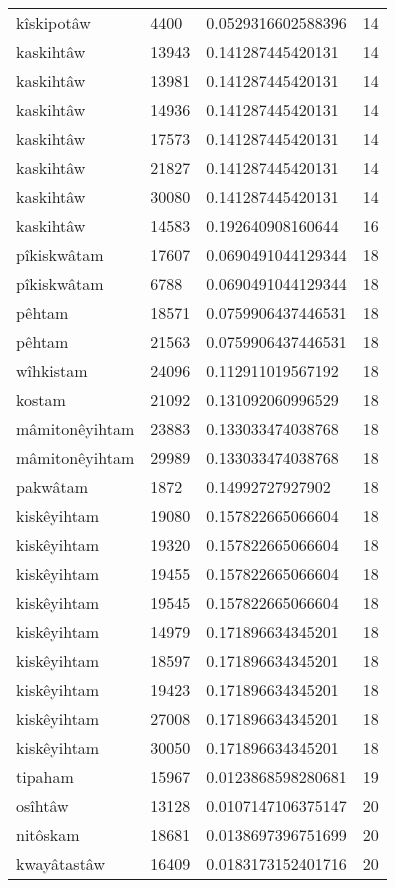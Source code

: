 \begin{longtable}{llll}
kîskipotâw & 4400 & 0.0529316602588396 & 14 \\
kaskihtâw & 13943 & 0.141287445420131 & 14 \\
kaskihtâw & 13981 & 0.141287445420131 & 14 \\
kaskihtâw & 14936 & 0.141287445420131 & 14 \\
kaskihtâw & 17573 & 0.141287445420131 & 14 \\
kaskihtâw & 21827 & 0.141287445420131 & 14 \\
kaskihtâw & 30080 & 0.141287445420131 & 14 \\
kaskihtâw & 14583 & 0.192640908160644 & 16 \\
pîkiskwâtam & 17607 & 0.0690491044129344 & 18 \\
pîkiskwâtam & 6788 & 0.0690491044129344 & 18 \\
pêhtam & 18571 & 0.0759906437446531 & 18 \\
pêhtam & 21563 & 0.0759906437446531 & 18 \\
wîhkistam & 24096 & 0.112911019567192 & 18 \\
kostam & 21092 & 0.131092060996529 & 18 \\
mâmitonêyihtam & 23883 & 0.133033474038768 & 18 \\
mâmitonêyihtam & 29989 & 0.133033474038768 & 18 \\
pakwâtam & 1872 & 0.14992727927902 & 18 \\
kiskêyihtam & 19080 & 0.157822665066604 & 18 \\
kiskêyihtam & 19320 & 0.157822665066604 & 18 \\
kiskêyihtam & 19455 & 0.157822665066604 & 18 \\
kiskêyihtam & 19545 & 0.157822665066604 & 18 \\
kiskêyihtam & 14979 & 0.171896634345201 & 18 \\
kiskêyihtam & 18597 & 0.171896634345201 & 18 \\
kiskêyihtam & 19423 & 0.171896634345201 & 18 \\
kiskêyihtam & 27008 & 0.171896634345201 & 18 \\
kiskêyihtam & 30050 & 0.171896634345201 & 18 \\
tipaham & 15967 & 0.0123868598280681 & 19 \\
osîhtâw & 13128 & 0.0107147106375147 & 20 \\
nitôskam & 18681 & 0.0138697396751699 & 20 \\
kwayâtastâw & 16409 & 0.0183173152401716 & 20 \\

\end{longtable}

